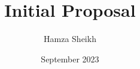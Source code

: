 \documentclass{article}
\title{Initial Proposal}
\author{Hamza Sheikh}
\date{September 2023}
\begin{document}
\maketitle

\tableofcontents
\break









\end{document}
